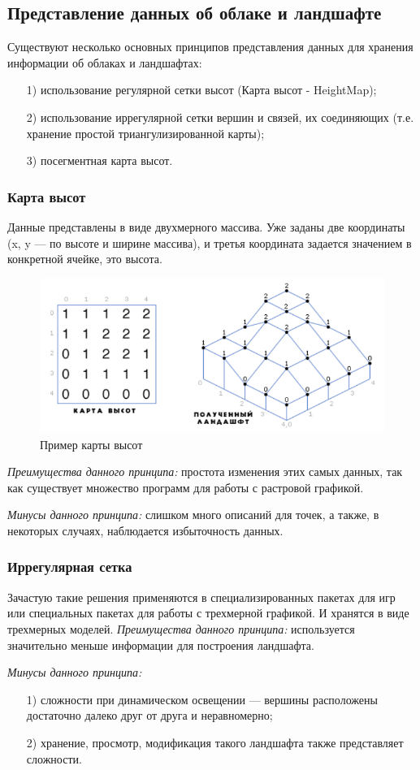 \documentclass[14pt, a4paper]{extarticle}
\begin{document}
\subsection{Представление данных об облаке и ландшафте}
Существуют несколько основных принципов представления данных для хранения информации об облаках и ландшафтах:
\begin{enumerate}
	\item[1)] использование регулярной сетки высот (Карта высот - HeightMap);
	\item[2)] использование иррегулярной сетки вершин и связей, их соединяющих (т.е. хранение простой триангулизированной карты);
	\item[3)] посегментная карта высот.
\end{enumerate}
\subsubsection{Карта высот}
Данные представлены в виде двухмерного массива. Уже заданы две координаты (x, y — по высоте и ширине массива), и третья координата задается значением в конкретной ячейке, это высота. 
\begin{figure}[h!]
	\centering
	\includegraphics[scale=0.9]{source/HeightMap}
	\caption{Пример карты высот}
	\label{HeightMap}
\end{figure}
\textit{Преимущества данного принципа:} простота изменения этих самых данных, так как существует множество программ для работы с растровой графикой.\par
\textit{Минусы данного принципа:} слишком много описаний для точек, а также, в некоторых случаях, наблюдается избыточность данных.
\subsubsection{Иррегулярная сетка}
Зачастую такие решения применяются в специализированных пакетах для игр или специальных пакетах для работы с трехмерной графикой. И хранятся в виде трехмерных моделей.
\textit{Преимущества данного принципа:} используется значительно меньше информации для построения ландшафта.\par
\textit{Минусы данного принципа:} 
\begin{enumerate}
	\item[1)] сложности при динамическом освещении — вершины расположены достаточно далеко друг от друга и неравномерно; 
	\item[2)] хранение, просмотр, модификация такого ландшафта также представляет сложности.
\end{enumerate}
\end{document}
